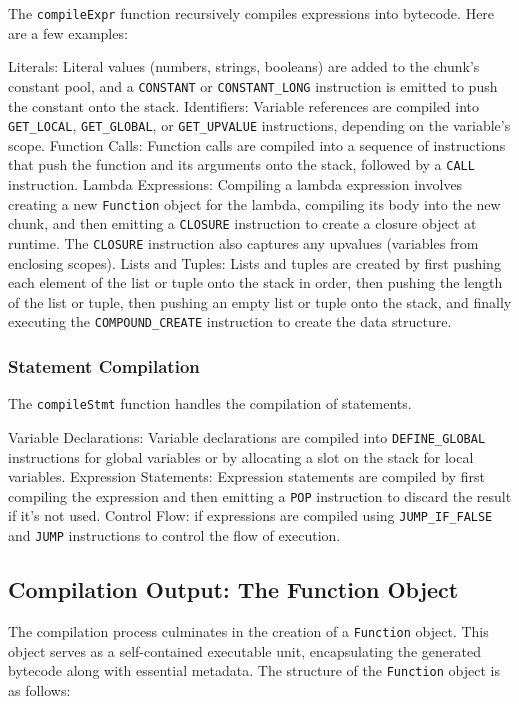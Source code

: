 The \texttt{compileExpr} function recursively compiles expressions into bytecode.
Here are a few examples:

Literals: Literal values (numbers, strings, booleans) are added to the chunk's constant pool, and a \texttt{CONSTANT} or \texttt{CONSTANT\_LONG} instruction is emitted to push the constant onto the stack.
Identifiers: Variable references are compiled into \texttt{GET\_LOCAL}, \texttt{GET\_GLOBAL}, or 
\texttt{GET\_UPVALUE} instructions, depending on the variable's scope.
Function Calls: Function calls are compiled into a sequence of instructions that push the function and its arguments onto the stack, followed by a \texttt{CALL} instruction.
Lambda Expressions: Compiling a lambda expression involves creating a new \texttt{Function} object for the lambda, compiling its body into the new chunk, and then emitting a \texttt{CLOSURE} instruction to create a closure object at runtime.
The \texttt{CLOSURE} instruction also captures any upvalues (variables from enclosing scopes).
Lists and Tuples: Lists and tuples are created by first pushing each element of the list or tuple onto the stack in 
order, then pushing the length of the list or tuple, then pushing an empty list or tuple onto the stack, and finally executing the \texttt{COMPOUND\_CREATE} instruction to create the data structure.

\subsubsection{Statement Compilation}

The \texttt{compileStmt} function handles the compilation of statements.

Variable Declarations: Variable declarations are compiled into \texttt{DEFINE\_GLOBAL} instructions for global 
variables or by allocating a slot on the stack for local variables.
Expression Statements: Expression statements are compiled by first compiling the expression and then emitting a \texttt{POP} instruction to discard the result if it's not used.
Control Flow: if expressions are compiled using \texttt{JUMP\_IF\_FALSE} and \texttt{JUMP} instructions 
to control the flow of execution.

\subsection{Compilation Output: The Function Object}
\label{subsec:compilation-output}

The compilation process culminates in the creation of a \texttt{Function} object.
This object serves as a self-contained executable unit, encapsulating the generated bytecode along with essential metadata.
The structure of the \texttt{Function} object is as follows:

